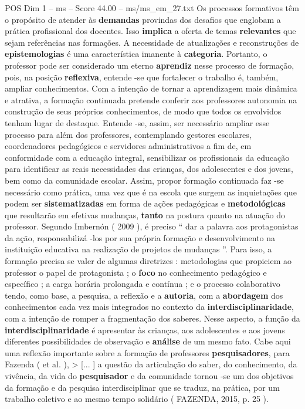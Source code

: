 \begin{textsample}{POS Dim 1 – ms – Score 44.00 – ms/ms\_em\_27.txt}
Os processos formativos têm o propósito de atender às \textbf{demandas} provindas dos desafios que englobam a prática profissional dos docentes.
Isso \textbf{implica} a oferta de temas \textbf{relevantes} que sejam referências nas formações.
A necessidade de atualizações e reconstruções de \textbf{epistemologias} é uma característica imanente à \textbf{categoria}.
Portanto, o professor pode ser considerado um eterno \textbf{aprendiz} nesse processo de formação, pois, na posição \textbf{reflexiva}, entende -se que fortalecer o trabalho é, também, ampliar conhecimentos.
Com a intenção de tornar a aprendizagem mais dinâmica e atrativa, a formação continuada pretende conferir aos professores autonomia na construção de seus próprios conhecimentos, de modo que todos os envolvidos tenham lugar de destaque.
Entende -se, assim, ser necessário ampliar esse processo para além dos professores, contemplando gestores escolares, coordenadores pedagógicos e servidores administrativos a fim de, em conformidade com a educação integral, sensibilizar os profissionais da educação para identificar as reais necessidades das crianças, dos adolescentes e dos jovens, bem como da comunidade escolar.
Assim, propor formação continuada faz -se necessário como prática, uma vez que é na escola que surgem as inquietações que podem ser \textbf{sistematizadas} em forma de ações pedagógicas e \textbf{metodológicas} que resultarão em efetivas mudanças, \textbf{tanto} na postura quanto na atuação do professor.
Segundo Imbernón ( 2009 ), é preciso “ dar a palavra aos protagonistas da ação, responsabilizá -los por sua própria formação e desenvolvimento na instituição educativa na realização de projetos de mudanças ”.
Para isso, a formação precisa se valer de algumas diretrizes : metodologias que propiciem ao professor o papel de protagonista ; o \textbf{foco} no conhecimento pedagógico e específico ; a carga horária prolongada e contínua ; e o processo colaborativo tendo, como base, a pesquisa, a reflexão e a \textbf{autoria}, com a \textbf{abordagem} dos conhecimentos cada vez mais integrados no contexto da \textbf{interdisciplinaridade}, com a intenção de romper a fragmentação dos saberes.
Nesse aspecto, a função da \textbf{interdisciplinaridade} é apresentar às crianças, aos adolescentes e aos jovens diferentes possibilidades de observação e \textbf{análise} de um mesmo fato.
Cabe aqui uma reflexão importante sobre a formação de professores \textbf{pesquisadores}, para Fazenda ( et al. ), > [... ] a questão da articulação do saber, do conhecimento, da vivência, da vida do \textbf{pesquisador} e da comunidade tornou -se um dos objetivos da formação e da pesquisa interdisciplinar que se traduz, na prática, por um trabalho coletivo e ao mesmo tempo solidário ( FAZENDA, 2015, p. 25 ).

\end{textsample}

